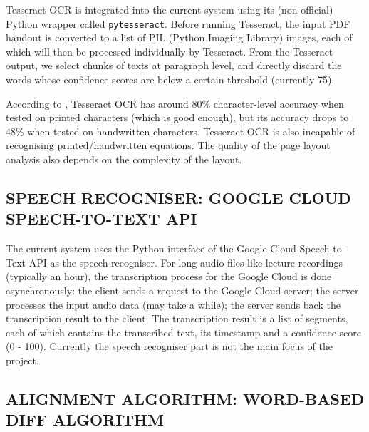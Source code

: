 \documentclass[12pt]{article}
\begin{document}
Tesseract OCR is integrated into the current system using its (non-official) Python wrapper called \texttt{pytesseract}. Before running Tesseract, the input PDF handout is converted to a list of PIL (Python Imaging Library) images, each of which will then be processed individually by Tesseract. From the Tesseract output, we select chunks of texts at paragraph level, and directly discard the words whose confidence scores are below a certain threshold (currently 75).


According to \cite{tesseval}, Tesseract OCR has around 80\% character-level accuracy when tested on printed characters (which is good enough), but its accuracy drops to 48\% when tested on handwritten characters. Tesseract OCR is also incapable of recognising printed/handwritten equations. The quality of the page layout analysis also depends on the complexity of the layout.

\subsection{SPEECH RECOGNISER: GOOGLE CLOUD SPEECH-TO-TEXT API}

The current system uses the Python interface of the Google Cloud Speech-to-Text API as the speech recogniser. For long audio files like lecture recordings (typically an hour), the transcription process for the Google Cloud is done asynchronously: the client sends a request to the Google Cloud server; the server processes the input audio data (may take a while); the server sends back the transcription result to the client. The transcription result is a list of segments, each of which contains the transcribed text, its timestamp and a confidence score (0 - 100). Currently the speech recogniser part is not the main focus of the project.


\subsection{ALIGNMENT ALGORITHM: WORD-BASED DIFF ALGORITHM}
\end{document}
